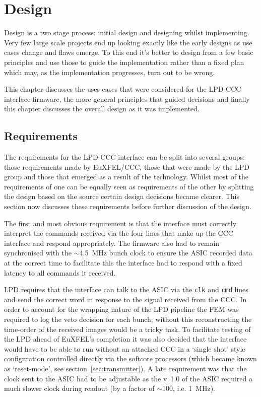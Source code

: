 \ifpdf
{}
\else
{}
\fi

\chapter{Design} %
\label{cha:design}
Design is a two stage process: initial design and designing whilst implementing. Very few large scale projects end up looking exactly like the early designs as use cases change and flaws emerge. To this end it's better to design from a few basic principles and use those to guide the implementation rather than a fixed plan which may, as the implementation progresses, turn out to be wrong.

This chapter discusses the uses cases that were considered for the LPD-CCC interface firmware, the more general principles that guided decisions and finally this chapter discusses the overall design as it was implemented.
\section{Requirements} %
\label{sec:requirements}
The requirements for the LPD-CCC interface can be split into several groups: those requirements made by EuXFEL/CCC, those that were made by the LPD group and those that emerged as a result of the technology. Whilst most of the requirements of one can be equally seen as requirements of the other by splitting the design based on the source certain design decisions became clearer. This section now discusses these requirements before further discussion of the design.

The first and most obvious requirement is that the interface must correctly interpret the commands received via the four lines that make up the CCC interface and respond appropriately. The firmware also had to remain synchronised with the \(\sim\)4.5~MHz bunch clock to ensure the ASIC recorded data at the correct time to facilitate this the interface had to respond with a fixed latency to all commands it received. 

LPD requires that the interface can talk to the ASIC via the \texttt{clk} and \texttt{cmd} lines and send the correct word in response to the signal received from the CCC. In order to account for the wrapping nature of the LPD pipeline the FEM was required to log the veto decision for each bunch; without this reconstructing the time-order of the received images would be a tricky task. To facilitate testing of the LPD ahead of EuXFEL's completion it was also decided that the interface would have to be able to run without an attached CCC in a `single shot' style configuration controlled directly via the softcore processors (which became known as `reset-mode', see section~\ref{sec:transmitter}). A late requirement was that the clock sent to the ASIC had to be adjustable as the v~1.0 of the ASIC required a much slower clock during readout (by a factor of \( \sim \)100, i.e. 1~MHz).
